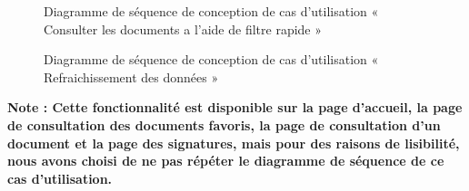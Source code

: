 \begin{figure}[H]
  \centering
  \caption{Diagramme de séquence de conception de cas d'utilisation « Consulter les documents a l'aide de filtre rapide »}
  \label{fig:sequence_conception_consulter_documents_filtre_rapide}
\end{figure}

\begin{figure}[H]
  \centering
  \caption{Diagramme de séquence de conception de cas d'utilisation « Refraichissement des données »}
  \label{fig:sequence_conception_refraichissement_donnees}
\end{figure}
\textbf{Note : Cette fonctionnalité est disponible sur la page d'accueil, la page de consultation des documents favoris, la page de consultation d'un document et la page des signatures, mais pour des raisons de lisibilité, nous avons choisi de ne pas répéter le diagramme de séquence de ce cas d'utilisation.}

